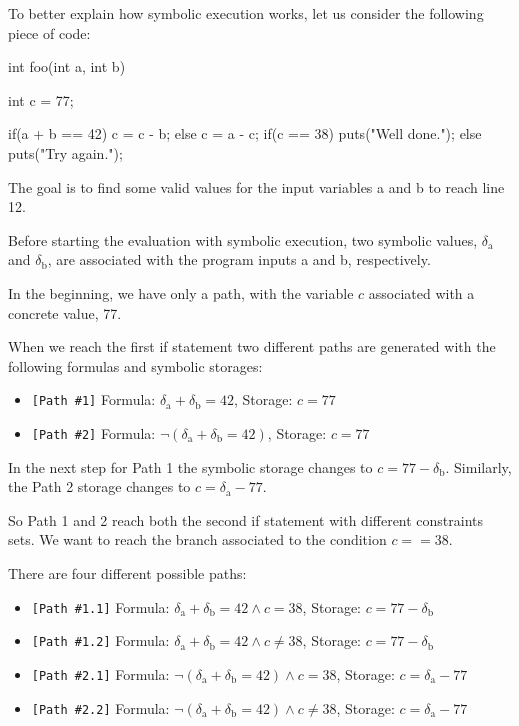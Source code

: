 To better explain how symbolic execution works, let us consider the following piece of code:

\begin{cpp_code}
int foo(int a, int b)
{
    int c = 77;

    if(a + b == 42) {
        c = c - b;
    }
    else {
        c = a - c;
    }
    if(c == 38) {
        puts("Well done.");
    }
    else {
        puts("Try again.");
    }
}
\end{cpp_code}

The goal is to find some valid values for the input variables a and b to reach line 12.

Before starting the evaluation with symbolic execution, two symbolic values, $\delta_{\mathrm{a}}$ and $\delta_{\mathrm{b}}$, are associated with the program inputs a and b, respectively.

In the beginning, we have only a path, with the variable $c$ associated with a concrete value, 77.

When we reach the first if statement two different paths are generated with the following formulas and symbolic storages:
\begin{itemize}
\item \verb|[Path #1]| Formula: $\delta_{\mathrm{a}} + \delta_{\mathrm{b}} = 42$, Storage: $c = 77$
\item \verb|[Path #2]| Formula: $\neg(\delta_{\mathrm{a}} + \delta_{\mathrm{b}} = 42)$, Storage: $c = 77$
\end{itemize}

In the next step for Path 1 the symbolic storage changes to $c = 77 - \delta_{\mathrm{b}}$.
Similarly, the Path 2 storage changes to $c = \delta_{\mathrm{a}} - 77$.

So Path 1 and 2 reach both the second if statement with different constraints sets.
We want to reach the branch associated to the condition $c == 38$.

There are four different possible paths:
\begin{itemize}
\item \verb|[Path #1.1]| Formula: $\delta_{\mathrm{a}} + \delta_{\mathrm{b}} = 42 \land c = 38$, Storage: $c = 77 - \delta_{\mathrm{b}}$
\item \verb|[Path #1.2]| Formula: $\delta_{\mathrm{a}} + \delta_{\mathrm{b}} = 42 \land c \neq 38$, Storage: $c = 77 - \delta_{\mathrm{b}}$
\item \verb|[Path #2.1]| Formula: $\neg(\delta_{\mathrm{a}} + \delta_{\mathrm{b}} = 42) \land c = 38$, Storage: $c = \delta_{\mathrm{a}} - 77$
\item \verb|[Path #2.2]| Formula: $\neg(\delta_{\mathrm{a}} + \delta_{\mathrm{b}} = 42) \land c \neq 38$, Storage: $c = \delta_{\mathrm{a}} - 77$
\end{itemize}

